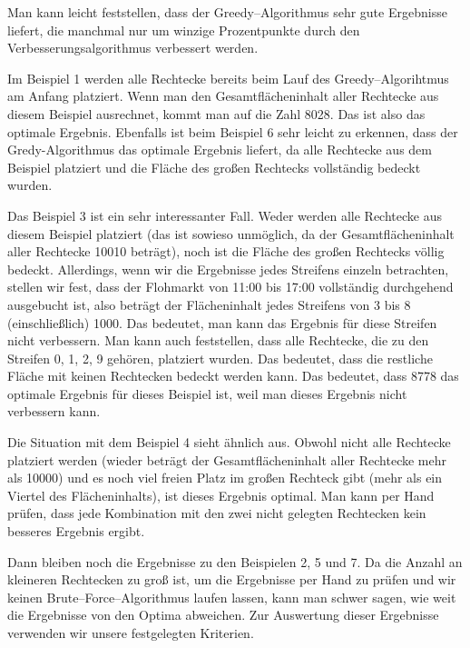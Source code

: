 


Man kann leicht feststellen, dass der Greedy--Algorithmus sehr gute Ergebnisse liefert, die 
manchmal nur um winzige Prozentpunkte durch den Verbesserungsalgorithmus verbessert werden.

Im Beispiel 1 werden alle Rechtecke bereits beim Lauf des Greedy--Algorihtmus am Anfang platziert.
Wenn man den Gesamtflächeninhalt aller Rechtecke aus diesem
Beispiel ausrechnet, kommt man auf die Zahl 8028.
Das ist also das optimale Ergebnis.
Ebenfalls ist beim Beispiel 6 sehr leicht zu erkennen, dass 
der Gredy-Algorithmus das optimale Ergebnis liefert, da alle 
Rechtecke aus dem Beispiel platziert und die Fläche des großen Rechtecks vollständig bedeckt wurden.

Das Beispiel 3 ist ein sehr interessanter Fall. 
Weder werden alle Rechtecke aus diesem Beispiel platziert (das ist sowieso unmöglich, da der Gesamtflächeninhalt aller Rechtecke 10010 beträgt), noch ist 
die Fläche des großen Rechtecks völlig bedeckt. 
Allerdings, wenn wir die Ergebnisse jedes Streifens einzeln betrachten, stellen wir fest,
dass der Flohmarkt von 11:00 bis 17:00 vollständig durchgehend ausgebucht ist, also beträgt
der Flächeninhalt jedes Streifens von 3 bis 8 (einschließlich) 1000.
Das bedeutet, man kann das Ergebnis für diese Streifen nicht verbessern. 
Man kann auch feststellen, dass alle Rechtecke, die zu den Streifen 0, 1, 2, 9 gehören,
platziert wurden.
Das bedeutet, dass die restliche Fläche
mit keinen Rechtecken bedeckt werden kann. Das bedeutet, dass 8778 das optimale Ergebnis für dieses
Beispiel ist, weil man dieses Ergebnis nicht verbessern kann.

Die Situation mit dem Beispiel 4 sieht ähnlich aus. 
Obwohl nicht alle Rechtecke platziert werden (wieder beträgt der Gesamtflächeninhalt aller
Rechtecke mehr als 10000) und es noch viel freien Platz im großen Rechteck gibt (mehr als ein Viertel des
Flächeninhalts), ist dieses Ergebnis optimal.
Man kann per Hand prüfen, dass jede Kombination mit den zwei nicht gelegten
Rechtecken kein besseres Ergebnis ergibt.

Dann bleiben noch die Ergebnisse zu den Beispielen 2, 5 und 7. 
Da die Anzahl an kleineren Rechtecken zu groß ist, um die Ergebnisse per Hand zu prüfen und
wir keinen Brute--Force--Algorithmus laufen lassen, kann man schwer sagen,
wie weit die Ergebnisse von den Optima abweichen. 
Zur Auswertung dieser Ergebnisse verwenden wir unsere festgelegten Kriterien.

